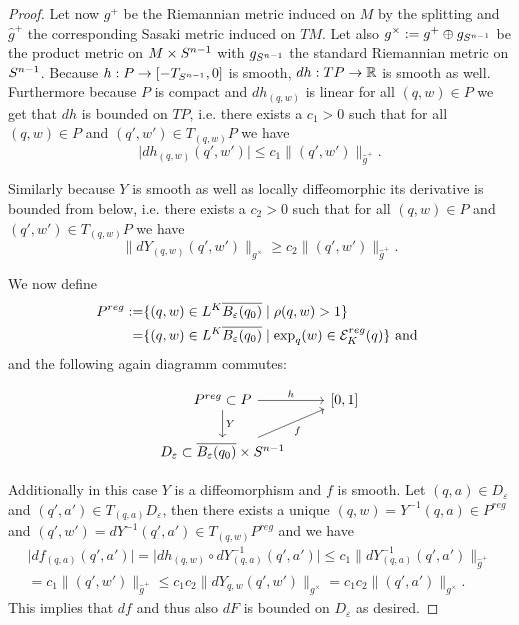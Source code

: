 \begin{proof}
    Let now $g^+$ be the Riemannian metric induced on $M$ by the splitting and $\widehat{g}^+$ the corresponding Sasaki metric induced on $TM$. Let also $g^\times:=g^+ \oplus g_{S^{n-1}}$ be the product metric on $M\times {S^{n-1}}$ with $g_{S^{n-1}}$ the standard Riemannian metric on ${S^{n-1}}$.
    Because $h:P\to [-T_{S^{n-1}},0]$ is smooth, $dh:TP\to \mathbb{R}$ is smooth as well. Furthermore because $P$ is compact and $dh_{(q,w)}$ is linear for all $(q,w)\in P$ we get that $dh$ is bounded on $TP$, i.e. 
    there exists a $c_1>0$ such that for all $(q,w)\in P$ and $(q',w')\in T_{(q,w)}P$ we have
    \[
        \lvert dh_{(q,w)}(q',w') \rvert \leq c_1\lVert (q',w') \rVert_{\widehat{g}^+}.
    \]

    Similarly because $Y$ is smooth as well as locally diffeomorphic its derivative is bounded from below, i.e. there exists a $c_2>0$ such that for all $(q,w)\in P$ and $(q',w')\in T_{(q,w)}P$ we have
    \[
        \lVert dY_{(q,w)}(q',w') \rVert_{g^\times} \geq c_2\lVert (q',w') \rVert_{\widehat{g}^+}.
    \]

    We now define 
    \begin{align*}
        P^{reg}:=& \{(q,w)\in L^K{\overline{B_\varepsilon(q_0)}} \mid \rho(q,w) > 1\}\\
        =& \{(q,w)\in L^K{\overline{B_\varepsilon(q_0)}} \mid \exp_q(w)\in {{\mathcal{E}}^{reg}_K}(q)\} \text{ and }
    \end{align*} and the following again diagramm commutes:

    \[\begin{tikzcd}
        {P^{reg}\subset P} & {[0,1]} \\
        {D_\varepsilon\subset \cl{B_\varepsilon(q_0)}\times \sn}
        \arrow["Y", from=1-1, to=2-1]
        \arrow["h", from=1-1, to=1-2]
        \arrow["f"', from=2-1, to=1-2]
    \end{tikzcd}\]   

    Additionally in this case $Y$ is a diffeomorphism and $f$ is smooth. Let $(q,a)\in D_\varepsilon$ and $(q',a')\in T_{(q,a)}D_\varepsilon$, then there exists a unique $(q,w)=Y^{-1}(q,a)\in P^{reg}$ and $(q',w')=dY^{-1}(q',a')\in T_{(q,w)}P^{reg}$ and we have 
    \begin{align*}
        \lvert df_{(q,a)}(q',a') \rvert = \lvert dh_{(q,w)}\circ dY^{-1}_{(q,a)}(q',a')\rvert\leq c_1 \lVert dY^{-1}_{(q,a)}(q',a')\rVert_{\widehat{g}^+} \\
        = c_1\lVert (q',w') \rVert_{\widehat{g}^+} \leq c_1c_2\lVert dY_{q,w}(q',w') \rVert_{g^\times} = c_1c_2\lVert(q',a')\rVert_{g^\times}.
    \end{align*}
    This implies that $df$ and thus also $dF$ is bounded on $D_\varepsilon$ as desired.
\end{proof}